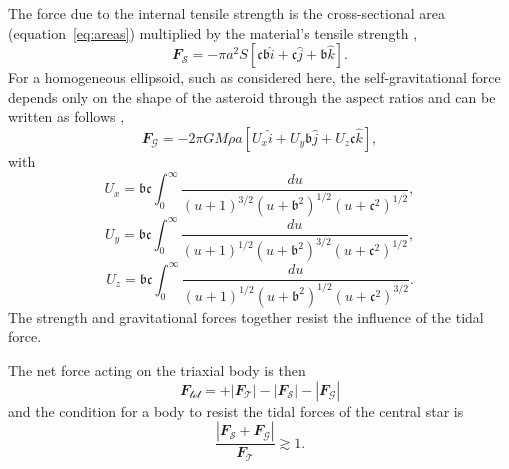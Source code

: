 \documentclass[fleqn,usenatbib]{mnras}
\begin{document}
The force due to the internal tensile strength is the cross-sectional area (equation~\ref{eq:areas}) multiplied by the material's tensile strength \citep{Davidsson2001}, 
\begin{equation}
    \label{eq:force_tensile}
    \mathcal{\mathbfit{F}_S} = - \pi a^2 S \left[ \mathfrak{c} \mathfrak{b} \hat{i} + \mathfrak{c} \hat{j} + \mathfrak{b} \hat{k} \right].
\end{equation}
For a homogeneous ellipsoid, such as considered here, the self-gravitational force depends only on the shape of the asteroid through the aspect ratios and can be written as follows \citep{Holsapple2004, Holsapple2006},
\begin{equation}
    \label{eq:force_selfgrav}
    \mathcal{\mathbfit{F}_G} = - 2 \pi G M \rho a \left[ U_x \hat{i} + U_y \mathfrak{b} \hat{j} + U_z \mathfrak{c} \hat{k} \right],
\end{equation}
with
\begin{equation}
    \label{eq:Ax}
    U_x = \mathfrak{b}\mathfrak{c} \int^\infty_0 \frac{du}{\left( u + 1\right)^{3/2}\left(u + \mathfrak{b}^2\right)^{1/2} \left(u + \mathfrak{c}^2\right)^{1/2}},
\end{equation}
\begin{equation}
    \label{eq:Ay}
    U_y = \mathfrak{b}\mathfrak{c} \int^\infty_0 \frac{du}{\left( u + 1\right)^{1/2}\left(u + \mathfrak{b}^2\right)^{3/2} \left(u + \mathfrak{c}^2\right)^{1/2}},
\end{equation}
\begin{equation}
    \label{eq:Az}
    U_z = \mathfrak{b}\mathfrak{c} \int^\infty_0 \frac{du}{\left( u + 1\right)^{1/2}\left(u + \mathfrak{b}^2\right)^{1/2} \left(u + \mathfrak{c}^2\right)^{3/2}}.
\end{equation}
The strength and gravitational forces together resist the influence of the tidal force.


The net force acting on the triaxial body is then 
\begin{equation}
    \label{eq:force_net}
    \mathcal{\mathbfit{F}_{\text{tot}}} = + |\mathcal{\mathbfit{F}_T}| - |\mathcal{\mathbfit{F}_S}| - |\mathcal{\mathbfit{F}_G}|
\end{equation}
and the condition for a body to resist the tidal forces of the central star is 
\begin{equation}
    \label{eq:cond_resist_frag}
    \frac{| \mathcal{\mathbfit{F}_S} + \mathcal{\mathbfit{F}_G} | }{\mathcal{\mathbfit{F}_T}} \gtrsim 1.
\end{equation}
\end{document}

